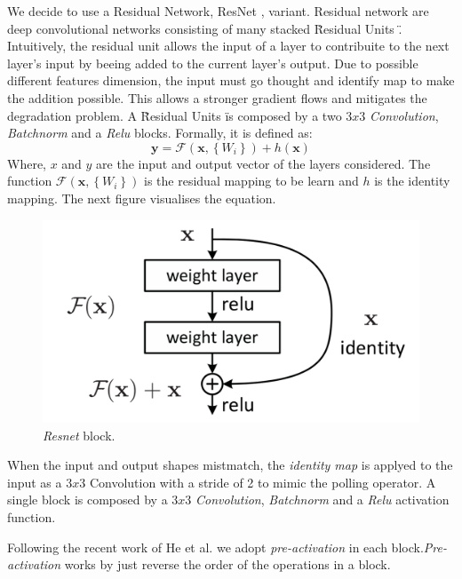 \documentclass[../document.tex]{subfiles}
\begin{document}
We decide to use a Residual Network, ResNet \cite{he2015deep}, variant. Residual network are deep convolutional
networks consisting of many stacked \" Residual Units \". Intuitively, the residual unit allows the input of a layer to contribuite to the next layer's input by beeing added to the current layer's output. Due to possible different features dimension, the input must go thought and identify map to make the addition possible. This allows a stronger gradient flows and mitigates the degradation problem. A \"Residual Units \" is composed by a two $3x3$ \emph{Convolution}, \emph{Batchnorm} \cite{ioffe2015batch} and a \emph{Relu} blocks. Formally, it is defined as: 
\begin{equation}
	\mathbf{y}=\mathcal{F}\left(\mathbf{x},\left\{W_{i}\right\}\right)+h(\mathbf{x})
	\label{eq : resnet}
\end{equation}
Where, $x$ and $y$ are the input and output vector of the layers considered. The function $\mathcal{F}\left(\mathbf{x},\left\{W_{i}\right\}\right)$ is the residual mapping to be learn and $h$ is the identity mapping. The next figure visualises the equation.

\begin{figure}[H]
	\centering
	\includegraphics[scale=0.3]{../img/implementation/estimator/resnet_block.png}
	\caption{\emph{Resnet} block.}
\end{figure}
When the input and output shapes mistmatch, the \emph{identity map} is applyed to the input as a $3x3$ Convolution with a stride of 2 to mimic the polling operator. A single block is composed by a $3x3$ \emph{Convolution}, \emph{Batchnorm} and a \emph{Relu} activation function. 

Following the recent work of He et al. \cite{he2015identity} we adopt \emph{pre-activation} in each block.\emph{Pre-activation} works by just reverse the order of the operations in a block.
\end{document}
